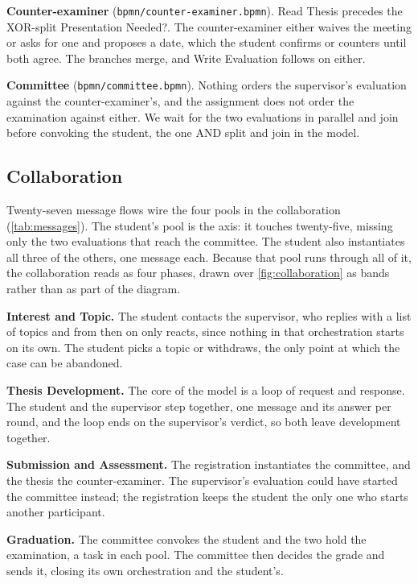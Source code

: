 \textbf{Counter-examiner} (\texttt{bpmn/counter-examiner.bpmn}). \textsf{Read Thesis} precedes the XOR-split \textsf{Presentation Needed?}. The counter-examiner either waives the meeting or asks for one and proposes a date, which the student confirms or counters until both agree. The branches merge, and \textsf{Write Evaluation} follows on either.

\textbf{Committee} (\texttt{bpmn/committee.bpmn}). Nothing orders the supervisor's evaluation against the counter-examiner's, and the assignment does not order the examination against either. We wait for the two evaluations in parallel and join before convoking the student, the one AND split and join in the model.

\subsection{Collaboration}
\label{sec:collaboration}

Twenty-seven message flows wire the four pools in the collaboration (\cref{tab:messages}). The student's pool is the axis: it touches twenty-five, missing only the two evaluations that reach the committee. The student also instantiates all three of the others, one message each. Because that pool runs through all of it, the collaboration reads as four phases, drawn over \cref{fig:collaboration} as bands rather than as part of the diagram.

\textbf{Interest and Topic.} The student contacts the supervisor, who replies with a list of topics and from then on only reacts, since nothing in that orchestration starts on its own. The student picks a topic or withdraws, the only point at which the case can be abandoned.

\textbf{Thesis Development.} The core of the model is a loop of request and response. The student and the supervisor step together, one message and its answer per round, and the loop ends on the supervisor's verdict, so both leave development together.

\textbf{Submission and Assessment.} The registration instantiates the committee, and the thesis the counter-examiner. The supervisor's evaluation could have started the committee instead; the registration keeps the student the only one who starts another participant.

\textbf{Graduation.} The committee convokes the student and the two hold the examination, a task in each pool. The committee then decides the grade and sends it, closing its own orchestration and the student's.

